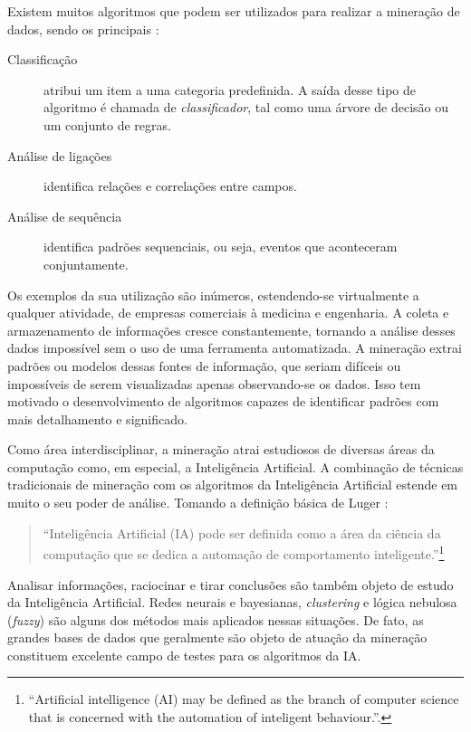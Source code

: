 Existem muitos algoritmos que podem ser utilizados para realizar a mineração de dados, sendo os principais \cite{Bace2000}:

\begin{description}
    \item[Classificação] atribui um item a uma categoria predefinida. A saída desse tipo de algoritmo é chamada de \emph{classificador}, tal como uma árvore de decisão ou um conjunto de regras.
    \item[Análise de ligações] identifica relações e correlações entre campos.
    \item[Análise de sequência] identifica padrões sequenciais, ou seja, eventos que aconteceram conjuntamente.
\end{description}

Os exemplos da sua utilização são inúmeros, estendendo-se virtualmente a qualquer atividade, de empresas comerciais à medicina e engenharia. A coleta e armazenamento de informações cresce constantemente, tornando a análise desses dados impossível sem o uso de uma ferramenta automatizada. A mineração extrai padrões ou modelos dessas fontes de informação, que seriam difíceis ou impossíveis de serem visualizadas apenas observando-se os dados. Isso tem motivado o desenvolvimento de algoritmos capazes de identificar padrões com mais detalhamento e significado.

Como área interdisciplinar, a mineração atrai estudiosos de diversas áreas da computação como, em especial, a Inteligência Artificial. A combinação de técnicas tradicionais de mineração com os algoritmos da Inteligência Artificial estende em muito o seu poder de análise. Tomando a definição básica de Luger \cite[p. 1]{Luger2009}:

\begin{quote}
``Inteligência Artificial (IA) pode ser definida como a área da ciência da computação que se dedica a automação de comportamento inteligente.''\footnote{``Artificial intelligence (AI) may be defined as the branch of computer science that is concerned with the automation of inteligent behaviour.''.}
\end{quote}

Analisar informações, raciocinar e tirar conclusões são também objeto de estudo da Inteligência Artificial. Redes neurais e bayesianas, \emph{clustering} e lógica nebulosa (\emph{fuzzy}) são alguns dos métodos mais aplicados nessas situações. De fato, as grandes bases de dados que geralmente são objeto de atuação da mineração constituem excelente campo de testes para os algoritmos da IA. 

